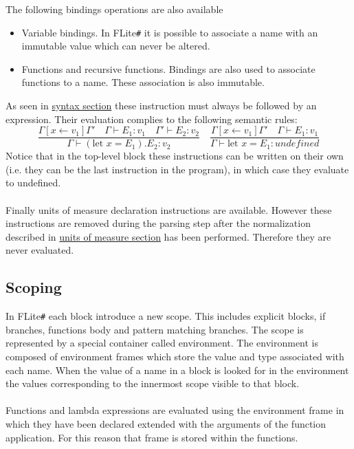 \documentclass[]{article}
\begin{document}
		The following bindings operations are also available
		\begin{itemize}
			\item Variable bindings. In FLite\verb|#| it is possible to associate a name with an immutable value which can never be altered.
			\item Functions and recursive functions. Bindings are also used to associate functions to a name. These association is also immutable.
		\end{itemize}
		As seen in \hyperref[sec:syntax]{syntax section} these instruction must always be followed by an expression. Their evaluation complies to the following semantic rules:
		\[
		\frac{\Gamma[x \leftarrow v_1]\Gamma' \quad \Gamma \vdash E_1: v_1 \quad \Gamma' 	\vdash E_2: v_2}{\Gamma \vdash (\text{let } x = E_1).E_2: v_2} \quad
		\frac{\Gamma[x \leftarrow v_1]\Gamma' \quad \Gamma \vdash E_1: v_1 }{\Gamma \vdash \text{let } x = E_1: undefined}
		\]
		Notice that in the top-level block these instructions can be written on their own (i.e. they can be the last instruction in the program), in which case they evaluate to undefined.\\\\
		Finally units of measure declaration instructions are available. However these instructions are removed during the parsing step after the normalization described in \hyperref[sec:UOM]{units of measure section} has been performed. Therefore they are never evaluated.
		
		\subsection{Scoping}
			In FLite\verb|#| each block introduce a new scope. This includes explicit blocks, if branches, functions body and pattern matching branches. The scope is represented by a special container called environment. The environment is composed of environment frames which store the value and type associated with each name. When the value of a name in a block is looked for in the environment the values corresponding to the innermost scope visible to that block.\\\\
			Functions and lambda expressions are evaluated using the environment frame in which they have been declared extended with the arguments of the function application. For this reason that frame is stored within the functions.
	
\end{document}
